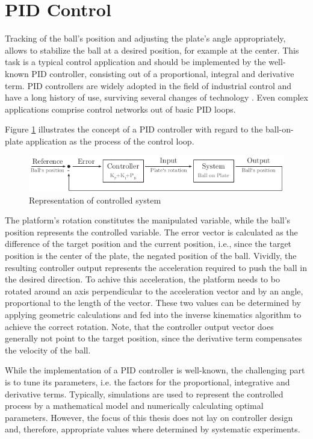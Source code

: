 \section{\acs{PID} Control}
Tracking of the ball's position and adjusting the plate's angle appropriately,
allows to stabilize the ball at a desired position, for example at the center.
This task is a typical control application and should be implemented by the
well-known \ac{PID} controller, consisting out of a proportional, integral and
derivative term. \ac{PID} controllers are widely adopted in the field of
industrial control and have a long history of use, surviving several changes
of technology \citep{Joh05}. Even complex applications comprise control
networks out of basic \ac{PID} loops.

Figure \ref{fig:pid_rep}  illustrates the concept of a \ac{PID} controller with
regard to the ball-on-plate application as the process of the control loop.
\begin{figure}
	\centering
	\centering
	\includegraphics{../figures/pid_rep}
	\caption{Representation of controlled system}
	\label{fig:pid_rep}
\end{figure}
The platform's rotation constitutes the manipulated variable, while the ball's
position represents the controlled variable. The error vector is calculated as
the difference of the target position and the current position, i.e., since
the target position is the center of the plate, the negated position of the
ball. Vividly, the resulting controller output represents the acceleration
required to push the ball in the desired direction. To achive this
acceleration, the platform needs to bo rotated around an axis perpendicular to
the acceleration vector and by an angle, proportional to the length of the
vector. These two values can be determined by applying geometric calculations
and fed into the inverse kinematics algorithm to achieve the correct rotation.
Note, that the controller output vector does generally not point to the target
position, since the derivative term compensates the velocity of the ball.

While the implementation of a \ac{PID} controller is well-known, the
challenging part is to tune its parameters, i.e. the factors for the
proportional, integrative and derivative terms. Typically, simulations are
used to represent the controlled process by a mathematical model and
numerically calculating optimal parameters. However, the focus of this thesis
does not lay on controller design and, therefore, appropriate values where
determined by systematic experiments.

